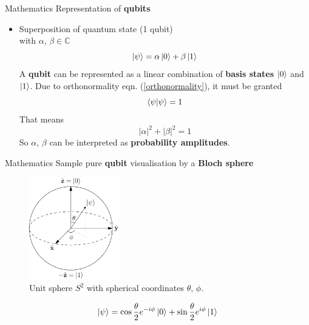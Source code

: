 \documentclass{beamer}
\begin{document}
\begin{frame}{Mathematics}
Representation of \textbf{qubits}
	\begin{itemize}
    	\item Superposition of quantum state (1 qubit)\\
        with $\alpha$, $\beta \in \mathbb{C}$
        	\begin{equation}
            	\ket{\psi} = \alpha\ket{0} + \beta\ket{1}
            \end{equation}
        A \textbf{qubit} can be represented as a linear combination of \textbf{basis states} $\ket{0}$ and $\ket{1}$. Due to orthonormality eqn. (\ref{orthonormality}), it must be granted
        	\begin{equation}
        		\braket{\psi|\psi} = 1
            \end{equation}
        That means
        	\begin{equation}
        		|\alpha|^2 + |\beta|^2 = 1
            \end{equation}
        So $\alpha$, $\beta$ can be interpreted as \textbf{probability amplitudes}.
    \end{itemize}
\end{frame}

\begin{frame}{Mathematics}
Sample pure \textbf{qubit} visualisation by a \textbf{Bloch sphere}
	\begin{figure}
		\begin{center}
    \includegraphics[width=0.35\textwidth]{500px-Bloch_Sphere_svg.png}
    \caption{Unit sphere $S^2$ with spherical coordinates $\theta$, $\phi$. }
    	\end{center}
    \end{figure}
   	\begin{equation}
		\ket{\psi} = \cos\frac{\theta}{2}e^{-i\phi}\ket{0}+\sin\frac{\theta}{2}e^{i\phi}\ket{1}
    \end{equation}
\end{frame}
\end{document}
